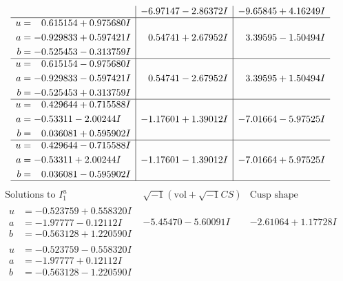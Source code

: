 \documentclass[1p]{elsarticle_modified}
\theoremstyle{definition}
\newcommand{\I}{\sqrt{-1}}
\begin{document}
$$\begin{array}{c|c|c}
 & -6.97147 - 2.86372 I & -9.65845 + 4.16249 I \\ \hline\begin{aligned}
u &= \phantom{-}0.615154 + 0.975680 I \\
a &= -0.929833 + 0.597421 I \\
b &= -0.525453 - 0.313759 I\end{aligned}
 & \phantom{-}0.54741 + 2.67952 I & \phantom{-}3.39595 - 1.50494 I \\ \hline\begin{aligned}
u &= \phantom{-}0.615154 - 0.975680 I \\
a &= -0.929833 - 0.597421 I \\
b &= -0.525453 + 0.313759 I\end{aligned}
 & \phantom{-}0.54741 - 2.67952 I & \phantom{-}3.39595 + 1.50494 I \\ \hline\begin{aligned}
u &= \phantom{-}0.429644 + 0.715588 I \\
a &= -0.53311 - 2.00244 I \\
b &= \phantom{-}0.036081 + 0.595902 I\end{aligned}
 & -1.17601 + 1.39012 I & -7.01664 - 5.97525 I \\ \hline\begin{aligned}
u &= \phantom{-}0.429644 - 0.715588 I \\
a &= -0.53311 + 2.00244 I \\
b &= \phantom{-}0.036081 - 0.595902 I\end{aligned}
 & -1.17601 - 1.39012 I & -7.01664 + 5.97525 I\\
 \hline 
 \end{array}$$\newpage$$\begin{array}{c|c|c}  
\text{Solutions to }I^u_{1}& \I (\text{vol} + \sqrt{-1}CS) & \text{Cusp shape}\\
 \hline 
\begin{aligned}
u &= -0.523759 + 0.558320 I \\
a &= -1.97777 - 0.12112 I \\
b &= -0.563128 + 1.220590 I\end{aligned}
 & -5.45470 - 5.60091 I & -2.61064 + 1.17728 I \\ \hline\begin{aligned}
u &= -0.523759 - 0.558320 I \\
a &= -1.97777 + 0.12112 I \\
b &= -0.563128 - 1.220590 I\end{aligned}

\end{array}$$
\end{document}
